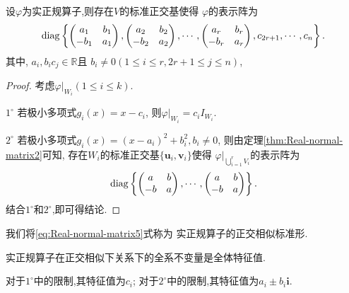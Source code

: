 \begin{theorem}\label{thm:Real-normal-matrix3}
  设$\varphi$为实正规算子,则存在$V$的标准正交基使得
  $\varphi$的表示阵为
  \begin{equation}\label{eq:Real-normal-matrix5}
    \operatorname{diag}\left\{
    \begin{pmatrix}
      a_1&b_1\\
      -b_1&a_1
    \end{pmatrix},
    \begin{pmatrix}
      a_2&b_2\\
      -b_2&a_2
    \end{pmatrix},\cdots,
    \begin{pmatrix}
      a_r&b_r\\
      -b_r&a_r
    \end{pmatrix},
    c_{2r+1},\cdots,c_n
    \right\}.
  \end{equation}
  其中, $a_i,b_ic_j\in\mathbb{R}$且
  $b_i\neq 0 (1\leq i \leq r, 2r+1\leq j \leq n)$,
\end{theorem}

\begin{proof}
  考虑$\varphi|_{W_i} (1\leq i \leq k)$.

  $1^{\circ}$ 若极小多项式$g_i(x)=x-c_i$,
  则$\varphi|_{W_i}=c_iI_{W_i}$.

  $2^{\circ}$ 若极小多项式$g_i(x)=(x-a_i)^2+b_i^2, b_i\neq 0$,
  则由定理\ref{thm:Real-normal-matrix2}可知,
  存在$W_i$的标准正交基$\{\bm{u}_i,\bm{v}_i\}$使得
  $\varphi|_{\bigcup_{i=1}^r V_i}$的表示阵为
  \[
    \operatorname{diag}\left\{
    \begin{pmatrix}
      a&b\\
      -b&a
    \end{pmatrix},\cdots,
    \begin{pmatrix}
      a&b\\
      -b&a
    \end{pmatrix}
  \right\}.
\]
结合$1^{\circ}$和$2^{\circ}$,即可得结论.
\end{proof}

\begin{remark}
  我们将\eqref{eq:Real-normal-matrix5}式称为
  实正规算子的正交相似标准形.

  实正规算子在正交相似下关系下的全系不变量是全体特征值.

  对于$1^{\circ}$中的限制,其特征值为$c_i$;
  对于$2^{\circ}$中的限制,其特征值为$a_i\pm b_i\bm{i}$.
\end{remark}

